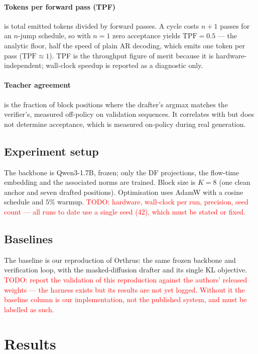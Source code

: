 \documentclass{zapiski}
\newcommand{\cm}[1]{\textcolor{red}{#1}}
\begin{document}
\paragraph{Tokens per forward pass (TPF)} is total emitted tokens divided by
forward passes. A cycle costs $n{+}1$ passes for an $n$-jump schedule, so with
$n = 1$ zero acceptance yields $\mathrm{TPF} = 0.5$ --- the analytic floor,
half the speed of plain AR decoding, which emits one token per pass
($\mathrm{TPF} \approx 1$). TPF is the throughput figure of merit because it is
hardware-independent; wall-clock speedup is reported as a diagnostic only.

\paragraph{Teacher agreement} is the fraction of block positions where the
drafter's argmax matches the verifier's, measured off-policy on validation
sequences. It correlates with but does not determine acceptance, which is
measured on-policy during real generation.

\subsection{Experiment setup}

The backbone is Qwen3-1.7B, frozen; only the DF projections, the flow-time
embedding and the associated norms are trained. Block size is $K = 8$ (one
clean anchor and seven drafted positions). Optimisation uses AdamW with a
cosine schedule and $5\%$ warmup. \cm{TODO: hardware, wall-clock per run,
precision, seed count --- all runs to date use a single seed (42), which must
be stated or fixed.}

\subsection{Baselines}

The baseline is our reproduction of Orthrus: the same frozen backbone and
verification loop, with the masked-diffusion drafter and its single KL
objective. \cm{TODO: report the validation of this reproduction against the
authors' released weights --- the harness exists but its results are not yet
logged. Without it the baseline column is our implementation, not the
published system, and must be labelled as such.}

\section{Results}
\label{sec:results}
\end{document}
